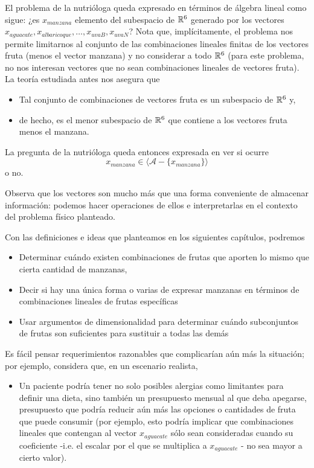 El problema de la nutrióloga queda expresado en términos
de álgebra lineal como sigue:
¿es $x_{manzana}$ elemento del subespacio de $\mathbb{R}^{6}$ generado
por los vectores $x_{aguacate}, x_{albaricoque}, \ldots ,
x_{uvaB}, x_{uvaN}$? Nota que, implícitamente,
el problema nos permite limitarnos al conjunto de
las combinaciones lineales finitas de los vectores fruta
(menos el vector manzana) y no considerar a todo $\mathbb{R}^{6}$
(para este problema, no nos interesan vectores que no sean combinaciones
lineales de vectores fruta). La teoría estudiada antes nos asegura que
\begin{itemize}
	\item Tal conjunto de combinaciones de vectores fruta
	es un subespacio de $\mathbb{R}^{6}$ y,
	\item de hecho, es el menor subespacio de $\mathbb{R}^{6}$ que contiene 
	a los vectores fruta menos el manzana.
\end{itemize}

La pregunta de la nutrióloga queda entonces expresada en ver si ocurre
\[
x_{manzana} \in \langle \mathcal{A} - \{ x_{manzana} \} \rangle
\]
o no.

Observa que los vectores son mucho más que una forma conveniente de 
almacenar información: podemos hacer operaciones de ellos e
interpretarlas en el contexto del 
problema físico planteado.

Con las definiciones e ideas que planteamos en los siguientes capítulos,
podremos 
\begin{itemize}
	\item Determinar cuándo existen combinaciones de frutas
	que aporten lo mismo que cierta cantidad de manzanas,
	\item Decir si hay una única forma o varias de expresar manzanas
	en términos de combinaciones lineales de frutas específicas
	\item Usar argumentos de dimensionalidad para determinar
	cuándo subconjuntos de frutas son suficientes para
	sustituir a todas las demás
\end{itemize}

Es fácil pensar requerimientos razonables
que complicarían aún más la situación; por ejemplo, considera que,
en un escenario realista, 
\begin{itemize}
	\item Un paciente podría tener no solo posibles alergias
	como limitantes para definir una dieta, sino también 
	un presupuesto mensual al que deba apegarse, presupuesto
	que podría reducir aún más las opciones o cantidades
	de fruta que puede consumir (por ejemplo, esto podría implicar
	que combinaciones lineales que contengan al vector
	$x_{aguacate}$ sólo sean consideradas cuando su coeficiente
	-i.e. el escalar por el que se multiplica a $x_{aguacate}$ - 
	no sea mayor a cierto valor).
\end{itemize}



